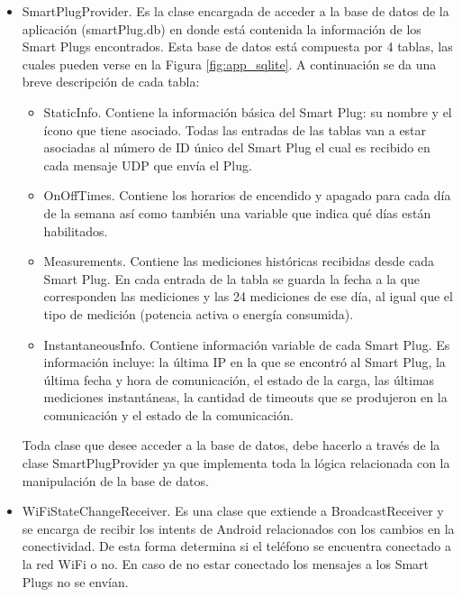 \begin{itemize}
\item SmartPlugProvider. Es la clase encargada de acceder a la base de datos de la aplicación (smartPlug.db) en donde está contenida la información de los Smart Plugs encontrados. Esta base de datos está compuesta por 4 tablas, las cuales pueden verse en la Figura \ref{fig:app_sqlite}. A continuación se da una breve descripción de cada tabla:

\begin{itemize}
\item StaticInfo. Contiene la información básica del Smart Plug: su nombre y el ícono que tiene asociado. Todas las entradas de las tablas van a estar asociadas al número de ID único del Smart Plug el cual es recibido en cada mensaje UDP que envía el Plug.
\item OnOffTimes. Contiene los horarios de encendido y apagado para cada día de la semana así como también una variable que indica qué días están habilitados.
\item Measurements. Contiene las mediciones históricas recibidas desde cada Smart Plug. En cada entrada de la tabla se guarda la fecha a la que corresponden las mediciones y las 24 mediciones de ese día, al igual que el tipo de medición (potencia activa o energía consumida).
\item InstantaneousInfo. Contiene información variable de cada Smart Plug. Es información incluye: la última IP en la que se encontró al Smart Plug, la última fecha y hora de comunicación, el estado de la carga, las últimas mediciones instantáneas, la cantidad de timeouts que se produjeron en la comunicación y el estado de la comunicación.
\end{itemize}

Toda clase que desee acceder a la base de datos, debe hacerlo a través de la clase SmartPlugProvider ya que implementa toda la lógica relacionada con la manipulación de la base de datos.

\item WiFiStateChangeReceiver. Es una clase que extiende a BroadcastReceiver y se encarga de recibir los intents de Android relacionados con los cambios en la conectividad. De esta forma determina si el teléfono se encuentra conectado a la red WiFi o no. En caso de no estar conectado los mensajes a los Smart Plugs no se envían.

\end{itemize}


